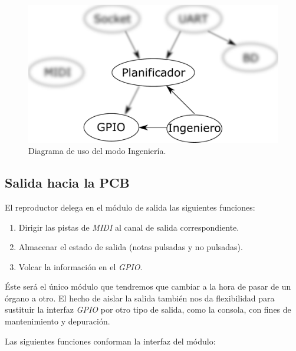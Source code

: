 \begin{figure}[H]
	\noindent \begin{centering}
		\includegraphics[width=\linewidth/2]{capitulo4/daemon_engineer}
		\par\end{centering}
	\smallskip
	\caption{\label{fig:daemon_engineer} Diagrama de uso del modo Ingeniería.}
\end{figure} 

\smallskip

\subsection{Salida hacia la PCB}

El reproductor delega en el módulo de salida las siguientes funciones:

\begin{enumerate}
	\item Dirigir las pistas de \textit{MIDI} al canal de salida correspondiente.
	\item Almacenar el estado de salida (notas pulsadas y no pulsadas).
	\item Volcar la información en el \textit{GPIO}.
\end{enumerate}

Éste será el único módulo que tendremos que cambiar a la hora de pasar de un órgano a otro. El hecho de aislar la salida también nos da flexibilidad para sustituir la interfaz \textit{GPIO} por otro tipo de salida, como la consola, con fines de mantenimiento y depuración.

Las siguientes funciones conforman la interfaz del módulo:

